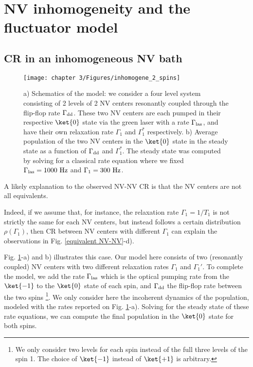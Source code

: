 \documentclass[a4paper, 11pt]{report}
\begin{document}
\section{NV inhomogeneity and the fluctuator model}

\subsection{CR in an inhomogeneous NV bath}
\begin{figure}[h]
\centering
\texttt{[image: chapter 3/Figures/inhomogene\_2\_spins]}
\caption{a) Schematics of the model: we consider a four level system consisting of 2 levels of 2 NV centers resonantly coupled through the flip-flop rate $\Gamma_{\rm dd}$. These two NV centers are each pumped in their respective $\ket{0}$ state via the green laser with a rate $\Gamma_{\rm las}$, and have their own relaxation rate $\Gamma_1$ and $\Gamma_1^*$ respectively. b) Average population of the two NV centers in the $\ket{0}$ state in the steady state as a function of $\Gamma_{\rm dd}$ and $\Gamma_1^*$. The steady state was computed by solving for a classical rate equation where we fixed $\Gamma_{\rm las}=1000\ \rm Hz$ and $\Gamma_1=300\ \rm Hz$.}
\label{inhomogene}
\end{figure}
A likely explanation to the observed NV-NV CR is that the NV centers are not all equivalents.

Indeed, if we assume that, for instance, the relaxation rate $\Gamma_1=1/T_1$ is not strictly the same for each NV centers, but instead follows a certain distribution $\rho(\Gamma_1)$, then CR between NV centers with different $\Gamma_1$ can explain the observations in Fig. \ref{equivalent NV-NV}-d).

Fig. \ref{inhomogene}-a) and b) illustrates this case. Our model here consists of two (resonantly coupled) NV centers with two different relaxation rates $\Gamma_1$ and $\Gamma_1'$. To complete the model, we add the rate $\Gamma_{\rm las}$ which is the optical pumping rate from the $\ket{-1}$ to the $\ket{0}$ state of each spin, and $\Gamma_{\rm dd}$ the flip-flop rate between the two spins \footnote{We only consider two levels for each spin instead of the full three levels of the spin 1. The choice of $\ket{-1}$ instead of $\ket{+1}$ is arbitrary.}. We only consider here the incoherent dynamics of the population, modeled with the rates reported on Fig. \ref{inhomogene}-a). Solving for the steady state of these rate equations, we can compute the final population in the $\ket{0}$ state for both spins. 
\end{document}
